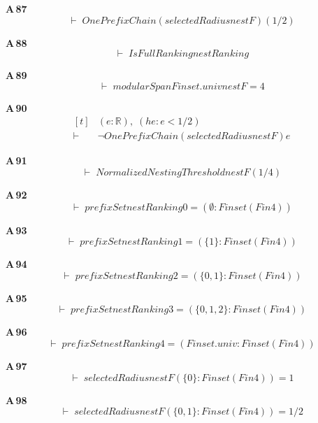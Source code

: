 \noindent\textbf{A\,87}\quad{}
{\footnotesize\[ \vdash\; \mathit{OnePrefixChain} (\mathit{selectedRadius} \mathit{nestF}) (1 / 2) \]}

\noindent\textbf{A\,88}\quad{}
{\footnotesize\[ \vdash\; \mathit{IsFullRanking} \mathit{nestRanking} \]}

\noindent\textbf{A\,89}\quad{}
{\footnotesize\[ \vdash\; \mathit{modularSpan} \mathit{Finset}.\mathit{univ} \mathit{nestF} = 4 \]}

\noindent\textbf{A\,90}\quad{}
{\footnotesize\[ \begin{aligned}[t]
&(\mathit{e} : \mathbb{R} ),\; (\mathit{he} : \mathit{e} < 1 / 2)\\
\vdash\;&\neg \mathit{OnePrefixChain} (\mathit{selectedRadius} \mathit{nestF}) \mathit{e}
\end{aligned} \]}

\noindent\textbf{A\,91}\quad{}
{\footnotesize\[ \vdash\; \mathit{NormalizedNestingThreshold} \mathit{nestF} (1 / 4) \]}

\noindent\textbf{A\,92}\quad{}
{\footnotesize\[ \vdash\; \mathit{prefixSet} \mathit{nestRanking} 0 = (\emptyset : \mathit{Finset} (\mathit{Fin} 4)) \]}

\noindent\textbf{A\,93}\quad{}
{\footnotesize\[ \vdash\; \mathit{prefixSet} \mathit{nestRanking} 1 = (\{ 1\} : \mathit{Finset} (\mathit{Fin} 4)) \]}

\noindent\textbf{A\,94}\quad{}
{\footnotesize\[ \vdash\; \mathit{prefixSet} \mathit{nestRanking} 2 = (\{ 0,1\} : \mathit{Finset} (\mathit{Fin} 4)) \]}

\noindent\textbf{A\,95}\quad{}
{\footnotesize\[ \vdash\; \mathit{prefixSet} \mathit{nestRanking} 3 = (\{ 0,1,2\} : \mathit{Finset} (\mathit{Fin} 4)) \]}

\noindent\textbf{A\,96}\quad{}
{\footnotesize\[ \vdash\; \mathit{prefixSet} \mathit{nestRanking} 4 = (\mathit{Finset}.\mathit{univ} : \mathit{Finset} (\mathit{Fin} 4)) \]}

\noindent\textbf{A\,97}\quad{}
{\footnotesize\[ \vdash\; \mathit{selectedRadius} \mathit{nestF} (\{ 0\} : \mathit{Finset} (\mathit{Fin} 4)) = 1 \]}

\noindent\textbf{A\,98}\quad{}
{\footnotesize\[ \vdash\; \mathit{selectedRadius} \mathit{nestF} (\{ 0,1\} : \mathit{Finset} (\mathit{Fin} 4)) = 1 / 2 \]}

